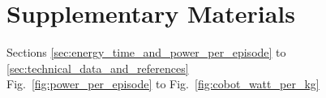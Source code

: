 \documentclass[12pt]{article}
\begin{document}
\section*{Supplementary Materials}
Sections \ref{sec:energy_time_and_power_per_episode} to \ref{sec:technical_data_and_references}\\
Fig.~\ref{fig:power_per_episode} to Fig.~\ref{fig:cobot_watt_per_kg}

\renewcommand\refname{References and Notes}


\end{document}
